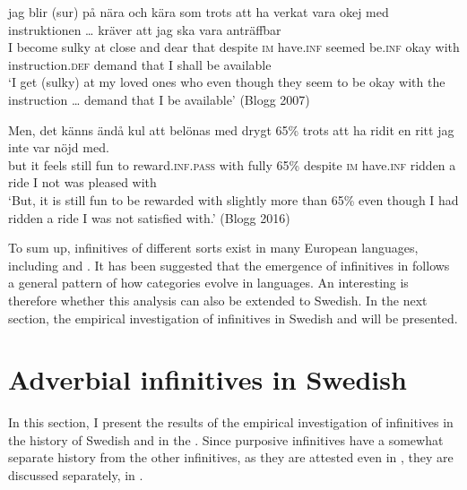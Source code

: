\documentclass[output=paper]{langscibook}
\begin{document}
\ea
\label{ex:kalm:7}
\ea  \label{ex:kalm:7a}
\gll jag blir (sur) på nära och kära som trots att ha verkat vara okej med {instruktionen …} kräver att jag ska vara anträffbar\\
I become sulky at close and dear that despite \textsc{im} have.\textsc{inf} seemed be.\textsc{inf} okay with instruction.\textsc{def} demand that I shall be available\\ 
\glt ‘I get (sulky) at my loved ones who even though they seem to be okay with the instruction … demand that I be available’ (Blogg 2007)

\ex  \label{ex:kalm:7b}
\gll Men, det känns ändå kul att belönas med drygt 65\% trots att ha ridit en ritt jag inte var nöjd med.\\
but it feels still fun to reward.\textsc{inf.pass} with fully 65\% despite \textsc{im} have.\textsc{inf} ridden a ride I not was pleased with\\ 
\glt ‘But, it is still fun to be rewarded with slightly more than 65\% even though I had ridden a ride I was not satisfied with.’ (Blogg 2016)
\z 
\z 



To sum up,  infinitives of different sorts exist in many European languages, including  and . It has been suggested that the emergence of  infinitives in  follows a general pattern of how  categories evolve in languages. An interesting  is therefore whether this analysis can also be extended to Swedish. In the next section, the empirical investigation of  infinitives in Swedish and  will be presented. 


\section{Adverbial infinitives in Swedish}\label{sec:kalm:4}
In this section, I present the results of the empirical investigation of  infinitives in the history of Swedish and in the  . Since purposive infinitives have a somewhat separate history from the other  infinitives, as they are attested even in , they are discussed separately, in .
\end{document}
